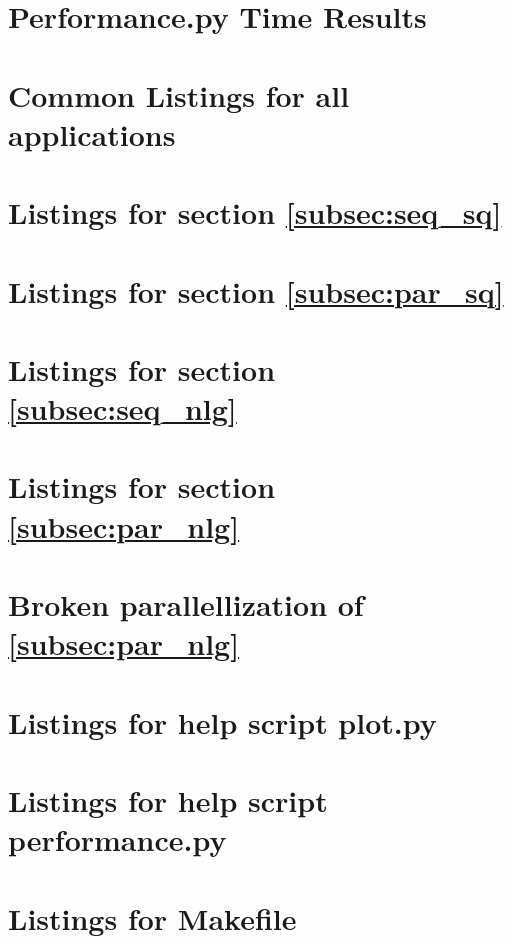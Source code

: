 \documentclass[titlepage,a4paper,12pt]{article}
\begin{document}
\newpage
\begin{appendices}
\section{Performance.py Time Results}


\section{Common Listings for all applications}


\newpage
\section{Listings for section \ref{subsec:seq_sq}}


\newpage
\section{Listings for section \ref{subsec:par_sq}}


\section{Listings for section \ref{subsec:seq_nlg}}


\newpage
\section{Listings for section \ref{subsec:par_nlg}}


\newpage
\section{Broken parallellization of \ref{subsec:par_nlg}}
\label{sec:par_nlg.broken}


\newpage
\section{Listings for help script plot.py}
\label{sec:plotpy}


\newpage
\section{Listings for help script performance.py}
\label{sec:perfpy}


\newpage
\section{Listings for Makefile}

\end{appendices}
\end{document}

